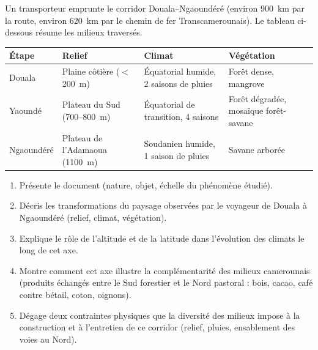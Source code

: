 \documentclass[11pt]{article}
\begin{document}
\begin{exercice}
Un transporteur emprunte le corridor Douala--Ngaoundéré (environ \SI{900}{km} par la route, environ \SI{620}{km} par le chemin de fer Transcamerounais). Le tableau ci-dessous résume les milieux traversés.

\begin{center}
\begin{tabularx}{\linewidth}{|l|X|X|X|}
\hline
\rowcolor{popblueL} \textbf{Étape} & \textbf{Relief} & \textbf{Climat} & \textbf{Végétation} \\
\hline
Douala & Plaine côtière ($<$ \SI{200}{m}) & Équatorial humide, 2 saisons de pluies & Forêt dense, mangrove \\
\hline
Yaoundé & Plateau du Sud (700--\SI{800}{m}) & Équatorial de transition, 4 saisons & Forêt dégradée, mosaïque forêt-savane \\
\hline
Ngaoundéré & Plateau de l'Adamaoua (\SI{1100}{m}) & Soudanien humide, 1 saison de pluies & Savane arborée \\
\hline
\end{tabularx}
\end{center}

\begin{enumerate}
\item Présente le document (nature, objet, échelle du phénomène étudié).
\item Décris les transformations du paysage observées par le voyageur de Douala à Ngaoundéré (relief, climat, végétation).
\item Explique le rôle de l'altitude et de la latitude dans l'évolution des climats le long de cet axe.
\item Montre comment cet axe illustre la complémentarité des milieux camerounais (produits échangés entre le Sud forestier et le Nord pastoral : bois, cacao, café contre bétail, coton, oignons).
\item Dégage deux contraintes physiques que la diversité des milieux impose à la construction et à l'entretien de ce corridor (relief, pluies, ensablement des voies au Nord).
\end{enumerate}
\end{exercice}
\end{document}
